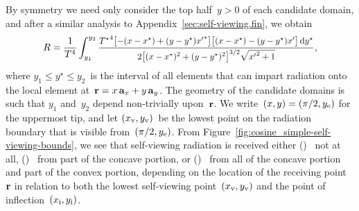 By symmetry
we need only consider the top half~$y > 0$ of each candidate domain,
and after a similar analysis to Appendix~\ref{sec:self-viewing.fin},
we obtain
\begin{equation}
  \savecontent{
    R =
      \frac{1}{T^4}
      \int_{y_1}^{y_2}
        \smallerfrac{
          {T^\star}^4
          \squarebr[\big]{-(x - x^\star) + (y - y^\star) {x'}^\star}
          \squarebr[\big]{(x - x^\star) - (y - y^\star) x'}
          \td y^\star
        }{
          2
          \squarebr[\big]{(x - x^\star)^2 + (y - y^\star)^2}^{3/2}
          \sqrt{{x'}^2 + 1}
        }
  }{eq:cosine-simple-self-viewing-ratio},
\end{equation}
where $y_1 \le y^\star \le y_2$~is the interval of
all elements that can impart radiation
onto the local element at~$\boldsymbol{\mathbf{r}} = x \mathop{}\!\boldsymbol{\mathbf{a}}_{x} + y \mathop{}\!\boldsymbol{\mathbf{a}}_{y}$.
The geometry of the candidate domains is such that
$y_1$ and~$y_2$ depend non-trivially upon~$\boldsymbol{\mathbf{r}}$.
We write~$(x, y) = (\pi/2, y_{\mathrm{e}})$ for the uppermost tip,
and let $(x_{\mathrm{v}}, y_{\mathrm{v}})$~be the lowest point on the radiation boundary
that is visible from~$(\pi/2, y_{\mathrm{e}})$.
From Figure~\ref{fig:cosine_simple-self-viewing-bounds},
we see that self-viewing radiation is received either
()~%
  not at all,
()~%
  from part of the concave portion, or
()~%
  from all of the concave portion and part of the convex portion,
depending on the location of the receiving point~$\boldsymbol{\mathbf{r}}$
in relation to both the lowest self-viewing point~$(x_{\mathrm{v}}, y_{\mathrm{v}})$
and the point of inflection~$(x_{\mathrm{i}}, y_{\mathrm{i}})$.

\begin{figure}
\end{figure}


